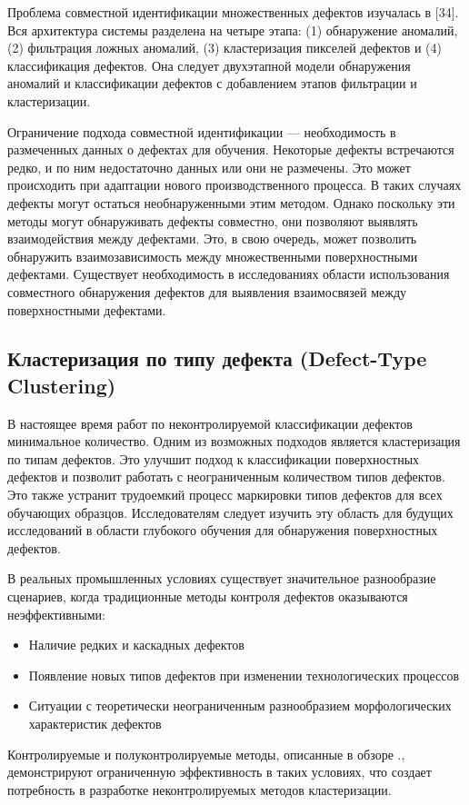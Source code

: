 \documentclass[14pt,a4paper]{article}
\begin{document}
{\color{red} Проблема совместной идентификации множественных дефектов изучалась в [34]. Вся архитектура системы разделена на четыре этапа: (1) обнаружение аномалий, (2) фильтрация ложных аномалий, (3) кластеризация пикселей дефектов и (4) классификация дефектов. Она следует двухэтапной модели обнаружения аномалий и классификации дефектов с добавлением этапов фильтрации и кластеризации.}

Ограничение подхода совместной идентификации — необходимость в размеченных данных о дефектах для обучения. Некоторые дефекты встречаются редко, и по ним недостаточно данных или они не размечены. Это может происходить при адаптации нового производственного процесса. В таких случаях дефекты могут остаться необнаруженными этим методом. Однако поскольку эти методы могут обнаруживать дефекты совместно, они позволяют выявлять взаимодействия между дефектами. Это, в свою очередь, может позволить обнаружить взаимозависимость между множественными поверхностными дефектами. Существует необходимость в исследованиях области использования совместного обнаружения дефектов для выявления взаимосвязей между поверхностными дефектами.

\subsection{Кластеризация по типу дефекта (Defect-Type Clustering)}

В настоящее время работ по неконтролируемой классификации дефектов минимальное количество. Одним из возможных подходов является кластеризация по типам дефектов. Это улучшит подход к классификации поверхностных дефектов и позволит работать с неограниченным количеством типов дефектов. Это также устранит трудоемкий процесс маркировки типов дефектов для всех обучающих образцов. Исследователям следует изучить эту область для будущих исследований в области глубокого обучения для обнаружения поверхностных дефектов.

В реальных промышленных условиях существует значительное разнообразие сценариев, когда традиционные методы контроля дефектов оказываются неэффективными:
\begin{itemize}
	\item Наличие редких и каскадных дефектов
	\item Появление новых типов дефектов при изменении технологических процессов
	\item Ситуации с теоретически неограниченным разнообразием морфологических характеристик дефектов
\end{itemize}
Контролируемые и полуконтролируемые методы, описанные в обзоре \cite{Bhatt2021}., демонстрируют ограниченную эффективность в таких условиях, что создает потребность в разработке неконтролируемых методов кластеризации.
\end{document}
